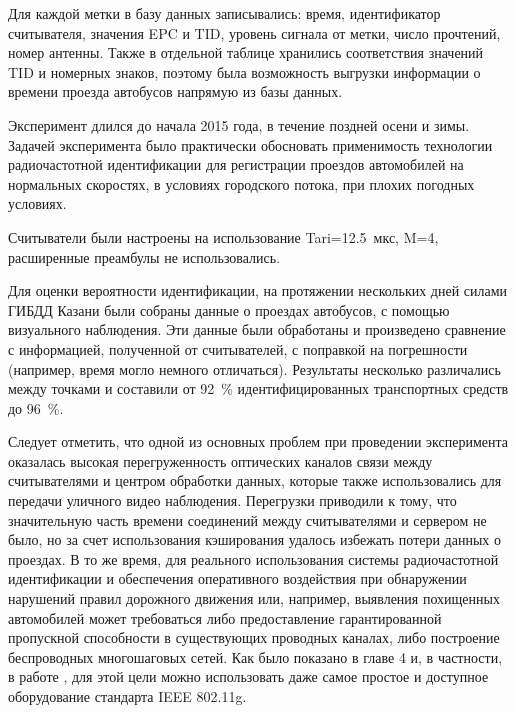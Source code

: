 Для каждой метки в базу данных записывались: время, идентификатор считывателя, значения EPC и TID, уровень сигнала от метки, число прочтений, номер антенны. Также в отдельной таблице хранились соответствия значений TID и номерных знаков, поэтому была возможность выгрузки информации о времени проезда автобусов напрямую из базы данных.


Эксперимент длился до начала 2015 года, в течение поздней осени и зимы. Задачей эксперимента было практически обосновать применимость технологии радиочастотной идентификации для регистрации проездов автомобилей на нормальных скоростях, в условиях городского потока, при плохих погодных условиях. 


Считыватели были настроены на использование Tari=12.5~мкс, M=4, расширенные преамбулы не использовались. 

Для оценки вероятности идентификации, на протяжении нескольких дней силами ГИБДД Казани были собраны данные о проездах автобусов, с помощью визуального наблюдения. Эти данные были обработаны и произведено сравнение с информацией, полученной от считывателей, с поправкой на погрешности (например, время могло немного отличаться). Результаты несколько различались между точками и составили от 92~\% идентифицированных транспортных средств до 96~\%. 

Следует отметить, что одной из основных проблем при проведении эксперимента оказалась высокая перегруженность оптических каналов связи между считывателями и центром обработки данных, которые также использовались для передачи уличного видео наблюдения. Перегрузки приводили к тому, что значительную часть времени соединений между считывателями и сервером не было, но за счет использования кэширования удалось избежать потери данных о проездах. В то же время, для реального использования системы радиочастотной идентификации и обеспечения оперативного воздействия при обнаружении нарушений правил дорожного движения или, например, выявления похищенных автомобилей может требоваться либо предоставление гарантированной пропускной способности в существующих проводных каналах, либо построение беспроводных многошаговых сетей. Как было показано в главе 4 и, в частности, в работе \cite{WINET_DCCN2018}, для этой цели можно использовать даже самое простое и доступное оборудование стандарта IEEE 802.11g.





\clearpage
